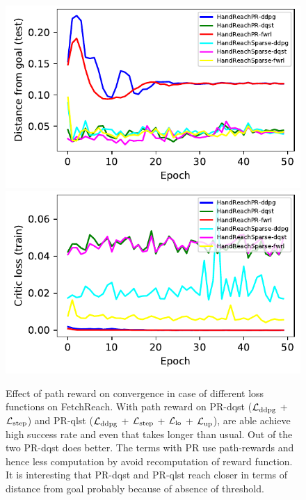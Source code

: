 \begin{figure}
  \includegraphics[width=\frac\columnwidth]{./media/res/d5cefef-path_reward-HandReachPR-v0-dqst/test/ag_g_dist.pdf}%
  \includegraphics[width=\frac\columnwidth]{./media/res/d5cefef-path_reward-HandReachPR-v0-dqst/train/critic_loss.pdf}\\
  \label{fig:path-reward-1}%
  \caption{Effect of path reward on convergence in case of different loss
    functions on FetchReach. With path reward on PR-dqst
    ($\mathcal{L}_{\text{ddpg}}$ + $\mathcal{L}_{\text{step}}$)
    and PR-qlst
    ($\mathcal{L}_{\text{ddpg}}$ + $\mathcal{L}_{\text{step}}$ + $\mathcal{L}_{\text{lo}}$ + $\mathcal{L}_{\text{up}}$), are able achieve high
    success rate and even that takes longer than usual. Out of the two PR-dqst
    does better. The terms with PR use path-rewards and hence less computation
    by avoid recomputation of reward function. It is interesting that PR-dqst
    and PR-qlst reach closer in terms of distance from goal probably because of
    absence of threshold.}%
\end{figure}%
% 
